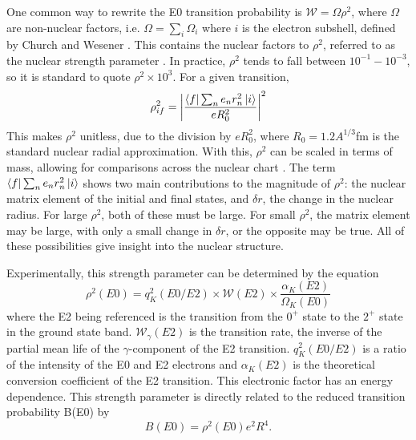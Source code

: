 One common way to rewrite the E0 transition probability is $\mathcal{W}=\Omega\rho^2$, where $\Omega$ are non-nuclear factors, i.e. $\Omega=\sum_i\Omega_i$ where $i$ is the electron subshell, defined by Church and Wesener \citep{church58:_monopole}. This contains the nuclear factors to $\rho^2$, referred to as the nuclear strength parameter \citep{church56:_monopole,wood99:_e0}. In practice, $\rho^2$ tends to fall between $10^{-1}-10^{-3}$, so it is standard to quote $\rho^2\times10^3$. For a given transition, \begin{equation}
    \rho^2_{if}=\abs{\frac{\bra{f}\sum_ne_nr_n^2\ket{i}}{eR_0^2}}^2
\end{equation}
This makes $\rho^2$ unitless, due to the division by $eR_0^2$, where $R_0=1.2A^{1/3}$fm is the standard nuclear radial approximation. With this, $\rho^2$ can be scaled in terms of mass, allowing for comparisons across the nuclear chart \citep{wood99:_e0}. The term $\bra{f}\sum_ne_nr_n^2\ket{i}$ shows two main contributions to the magnitude of $\rho^2$: the nuclear matrix element of the initial and final states, and $\delta r$, the change in the nuclear radius. For large $\rho^2$, both of these must be large. For small $\rho^2$, the matrix element may be large, with only a small change in $\delta r$, or the opposite may be true. All of these possibilities give insight into the nuclear structure.

Experimentally, this strength parameter can be determined by the equation
\begin{equation}
\label{eq:rho_life}
    \rho^2(E0)=q_K^2(E0/E2)\times\mathcal{W}(E2)\times\frac{\alpha_K(E2)}{\Omega_K(E0)}
\end{equation}
where the E2 being referenced is the transition from the $0^+$ state to the $2^+$ state in the ground state band. $\mathcal{W}_{\gamma}(E2)$ is the transition rate, the inverse of the partial mean life of the $\gamma$-component of the E2 transition. $q_K^2(E0/E2)$ is a ratio of the intensity of the E0 and E2 electrons and $\alpha_K(E2)$ is the theoretical conversion coefficient of the E2 transition. This electronic factor has an energy dependence. This strength parameter is directly related to the reduced transition probability B(E0) by
\begin{equation}
\label{eq:BE0}
    B(E0)=\rho^2(E0)e^2R^4.
\end{equation}

